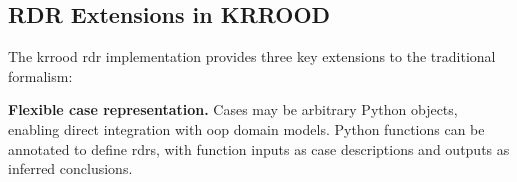 \documentclass[a4paper,fleqn]{cas-sc}
\begin{document}

\subsection{RDR Extensions in KRROOD}
The \ac{krrood} \ac{rdr} implementation provides three key extensions to the traditional formalism:

\textbf{Flexible case representation.} Cases may be arbitrary Python objects, enabling direct integration with \ac{oop} domain models. Python functions can be annotated to define \acp{rdr}, with function inputs as case descriptions and outputs as inferred conclusions.
\end{document}
